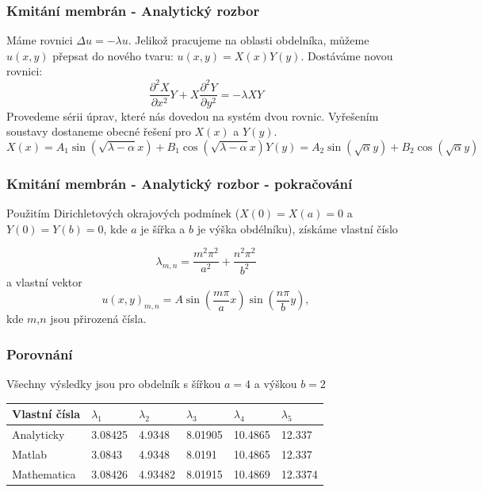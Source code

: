 \documentclass[xcolor=table]{beamer}
\begin{document}
\begin{frame}
\frametitle{Kmitání membrán - Analytický rozbor}
\pause
Máme rovnici $\Delta u=-\lambda u$. Jelikož pracujeme na oblasti obdelníka, můžeme $u(x,y)$ přepsat do nového tvaru: $u(x,y)=X(x) Y(y)$.
\pause
Dostáváme novou rovnici:
\begin{equation}
   \frac{\partial^2 X}{\partial x^2} Y
      + X \frac{\partial^2 Y}{\partial y^2}=-\lambda X Y
\end{equation}
\pause
Provedeme sérii úprav, které nás dovedou na systém dvou rovnic. Vyřešením soustavy dostaneme obecné řešení pro $X(x)$ a $Y(y)$.
\pause
\begin{subequations} 
\begin{equation}
X(x)=A_1 \sin{(\sqrt{\lambda-\alpha}x)}+B_1 \cos{(\sqrt{\lambda-\alpha}x)}
\end{equation}
\begin{equation}
Y(y)=A_2 \sin{(\sqrt{\alpha}y)}+B_2 \cos{(\sqrt{\alpha}y)}
\end{equation}
\end{subequations}

\end{frame}

\begin{frame}
\frametitle{Kmitání membrán - Analytický rozbor - pokračování}
Použitím Dirichletových okrajových podmínek ($X(0)=X(a)=0$ a $Y(0)=Y(b)=0$, kde $a$ je šířka a $b$ je výška obdélníku), získáme vlastní číslo

\begin{equation}
\lambda_{m,n}=\frac{m^2\pi^2}{a^2}+\frac{n^2\pi^2}{b^2}
\end{equation}
\pause
a vlastní vektor
\begin{equation}
u(x,y)_{m,n}=A\sin{(\frac{m\pi}{a}x)}\sin{(\frac{n\pi}{b}y)},
\end{equation}
kde $m$,$n$ jsou přirozená čísla.
\end{frame}

\begin{frame}
\frametitle{Porovnání}
Všechny výsledky jsou pro obdelník s šířkou $a=4$ a výškou $b=2$

\begin{table}[]
\begin{tabular}{|llllll|}
\hline
\rowcolor[HTML]{EFEFEF} 
\cellcolor[HTML]{C0C0C0}Vlastní čísla & $\lambda_1$      & $\lambda_2$        & $\lambda_3$    & $\lambda_4$    & $\lambda_5$     \\ \hline
\rowcolor[HTML]{CBCEFB} 
\cellcolor[HTML]{9698ED}Analyticky    & 3.08425 & 4.9348  & 8.01905 & 10.4865 & 12.337  \\ \hline
\rowcolor[HTML]{FFCE93} 
\cellcolor[HTML]{FE996B}Matlab        & 3.0843  & 4.9348  & 8.0191  & 10.4865 & 12.337  \\ \hline
\rowcolor[HTML]{FFCCC9} 
\cellcolor[HTML]{FD6864}Mathematica   & 3.08426 & 4.93482 & 8.01915 & 10.4869 & 12.3374 \\ \hline
\end{tabular}
\end{table}

\end{frame}
\end{document}
